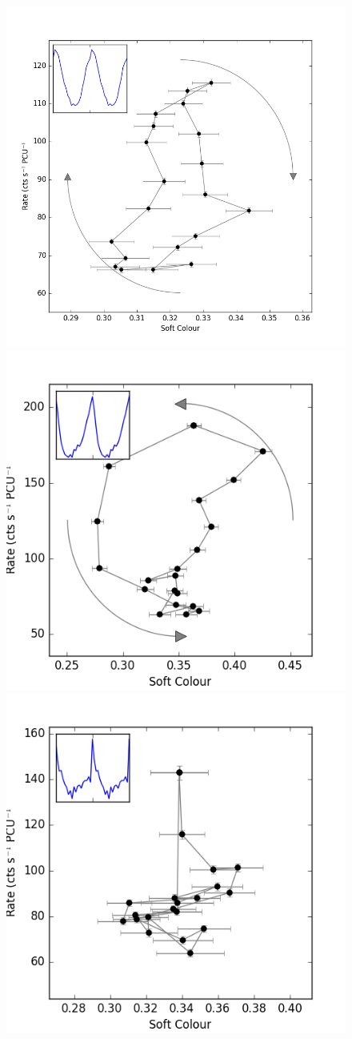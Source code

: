 \begin{figure}
    \includegraphics[width=\columnwidth, trim = 0mm 0mm 0mm 0mm]{images/Kloop.png}\\
    \includegraphics[width=0.5\columnwidth, trim = 0mm 0mm 0mm 0mm]{images/Kloop2.png}\includegraphics[width=0.5\columnwidth, trim = 0mm 0mm 0mm 0mm]{images/Kloop3.png}

\end{figure}
